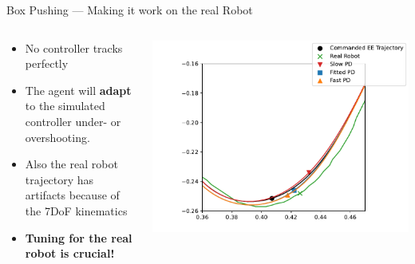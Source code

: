 \documentclass[16:9,en,navbarinfooter]{sdqbeamer}
\begin{document}
\begin{frame}{Box Pushing --- Making it work on the real Robot}
	\begin{columns}
		\begin{column}{0.5\textwidth}
			\begin{itemize}
				\item No controller tracks perfectly
				\item The agent will \textbf{adapt} to the simulated controller under- or overshooting.
				\item Also the real robot trajectory has artifacts because of the 7DoF kinematics
				\item \textbf{Tuning for the real robot is crucial!}
			\end{itemize}
		\end{column}
		\begin{column}{0.5\textwidth}
			\includegraphics[width=\linewidth]{media/traj_error.pdf}
		\end{column}
	\end{columns}

\end{frame}
\end{document}
